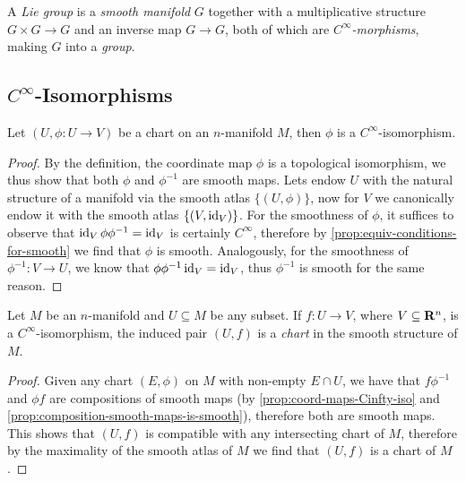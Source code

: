 \begin{definition}
    \label{def:lie-group}
    A \emph{Lie group} is a \emph{smooth manifold} \(G\) together with a
    multiplicative structure \(G \times G \to G\) and an inverse map \(G \to G\),
    both of which are \emph{\(C^{\infty}\)-morphisms}, making \(G\) into a
    \emph{group}.
\end{definition}

\subsection{\texorpdfstring{\(C^{\infty}\)}{smooth}-Isomorphisms}

\begin{proposition}
    \label{prop:coord-maps-Cinfty-iso}
    Let \((U, \phi: U \to V)\) be a chart on an \(n\)-manifold \(M\), then \(\phi\)
    is a \(C^\infty\)-isomorphism.
\end{proposition}

\begin{proof}
    By the definition, the coordinate map \(\phi\) is a topological isomorphism, we
    thus show that both \(\phi\) and \(\phi^{-1}\) are smooth maps. Lets endow \(U\)
    with the natural structure of a manifold via the smooth atlas \(\{(U, \phi)\}\),
    now for \(V\) we canonically endow it with the smooth atlas
    \(\{(V, \operatorname{id}_{V})\}\). For the smoothness of \(\phi\), it suffices to observe
    that \(\operatorname{id}_V \phi \phi^{-1} = \operatorname{id}_V\) is certainly \(C^{\infty}\), therefore by
    \cref{prop:equiv-conditions-for-smooth} we find that \(\phi\) is
    smooth. Analogously, for the smoothness of \(\phi^{-1}: V \to U\), we know that
    \(\phi \phi^{-1} \operatorname{id}_V = \operatorname{id}_V\), thus \(\phi^{-1}\) is smooth for the same
    reason.
\end{proof}

\begin{proposition}
    \label{prop:smooth-iso-is-charts}
    Let \(M\) be an \(n\)-manifold and \(U \subseteq M\) be any subset. If
    \(f: U \to V\), where \(V \subseteq \mathbf{R}^n\), is a \(C^{\infty}\)-isomorphism, the
    induced pair \((U, f)\) is a \emph{chart} in the smooth structure of \(M\).
\end{proposition}

\begin{proof}
    Given any chart \((E, \phi)\) on \(M\) with non-empty \(E \cap U\), we have that
    \(f \phi^{-1}\) and \(\phi f\) are compositions of smooth maps (by
    \cref{prop:coord-maps-Cinfty-iso} and
    \cref{prop:composition-smooth-maps-is-smooth}), therefore both are smooth
    maps. This shows that \((U, f)\) is compatible with any intersecting chart of
    \(M\), therefore by the maximality of the smooth atlas of \(M\) we find that
    \((U, f)\) is a chart of \(M\).
\end{proof}

